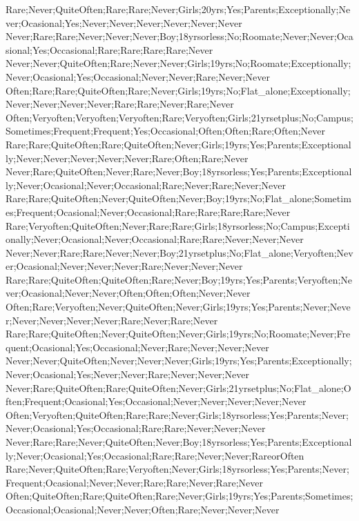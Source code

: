 Rare;Never;QuiteOften;Rare;Rare;Never;Girls;20yrs;Yes;Parents;Exceptionally;Never;Ocasional;Yes;Never;Never;Never;Never;Never;Never
Never;Rare;Rare;Never;Never;Never;Boy;18yrsorless;No;Roomate;Never;Never;Ocasional;Yes;Occasional;Rare;Rare;Rare;Rare;Never
Never;Never;QuiteOften;Rare;Never;Never;Girls;19yrs;No;Roomate;Exceptionally;Never;Ocasional;Yes;Occasional;Never;Never;Rare;Never;Never
Often;Rare;Rare;QuiteOften;Rare;Never;Girls;19yrs;No;Flat_alone;Exceptionally;Never;Never;Never;Never;Rare;Rare;Never;Rare;Never
Often;Veryoften;Veryoften;Veryoften;Rare;Veryoften;Girls;21yrsetplus;No;Campus;Sometimes;Frequent;Frequent;Yes;Occasional;Often;Often;Rare;Often;Never
Rare;Rare;QuiteOften;Rare;QuiteOften;Never;Girls;19yrs;Yes;Parents;Exceptionally;Never;Never;Never;Never;Never;Rare;Often;Rare;Never
Never;Rare;QuiteOften;Never;Rare;Never;Boy;18yrsorless;Yes;Parents;Exceptionally;Never;Ocasional;Never;Occasional;Rare;Never;Rare;Never;Never
Rare;Rare;QuiteOften;Never;QuiteOften;Never;Boy;19yrs;No;Flat_alone;Sometimes;Frequent;Ocasional;Never;Occasional;Rare;Rare;Rare;Rare;Never
Rare;Veryoften;QuiteOften;Never;Rare;Rare;Girls;18yrsorless;No;Campus;Exceptionally;Never;Ocasional;Never;Occasional;Rare;Rare;Never;Never;Never
Never;Never;Rare;Rare;Never;Never;Boy;21yrsetplus;No;Flat_alone;Veryoften;Never;Ocasional;Never;Never;Never;Rare;Never;Never;Never
Rare;Rare;QuiteOften;QuiteOften;Rare;Never;Boy;19yrs;Yes;Parents;Veryoften;Never;Ocasional;Never;Never;Often;Often;Often;Never;Never
Often;Rare;Veryoften;Never;QuiteOften;Never;Girls;19yrs;Yes;Parents;Never;Never;Never;Never;Never;Never;Rare;Never;Rare;Never
Rare;Rare;QuiteOften;Never;QuiteOften;Never;Girls;19yrs;No;Roomate;Never;Frequent;Ocasional;Yes;Occasional;Never;Rare;Never;Never;Never
Never;Never;QuiteOften;Never;Never;Never;Girls;19yrs;Yes;Parents;Exceptionally;Never;Ocasional;Yes;Never;Never;Rare;Never;Never;Never
Never;Rare;QuiteOften;Rare;QuiteOften;Never;Girls;21yrsetplus;No;Flat_alone;Often;Frequent;Ocasional;Yes;Occasional;Never;Never;Never;Never;Never
Often;Veryoften;QuiteOften;Rare;Rare;Never;Girls;18yrsorless;Yes;Parents;Never;Never;Ocasional;Yes;Occasional;Rare;Rare;Never;Never;Never
Never;Rare;Rare;Never;QuiteOften;Never;Boy;18yrsorless;Yes;Parents;Exceptionally;Never;Ocasional;Yes;Occasional;Rare;Rare;Never;Never;RareorOften
Rare;Never;QuiteOften;Rare;Veryoften;Never;Girls;18yrsorless;Yes;Parents;Never;Frequent;Ocasional;Never;Never;Rare;Rare;Never;Rare;Never
Often;QuiteOften;Rare;QuiteOften;Rare;Never;Girls;19yrs;Yes;Parents;Sometimes;Occasional;Ocasional;Never;Never;Often;Rare;Never;Never;Never
